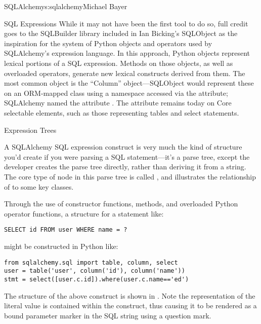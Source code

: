 \begin{aosachapter}{SQLAlchemy}{s:sqlalchemy}{Michael Bayer}
\begin{aosasect1}{SQL Expressions}
While it may not have been the first tool to do so, full
credit goes to the SQLBuilder library included in Ian
Bicking's SQLObject as the inspiration for the
system of Python objects and operators used by
SQLAlchemy's expression language. In this approach,
Python objects represent lexical portions of a SQL
expression. Methods on those objects, as well as
overloaded operators, generate new lexical constructs
derived from them. The most common object is the ``Column''
object---SQLObject would represent these on an ORM-mapped
class using a namespace accessed via the  attribute;
SQLAlchemy named the attribute . The 
attribute remains today on Core selectable elements,
such as those representing tables and select statements.

\begin{aosasect2}{Expression Trees}

A SQLAlchemy SQL expression construct is very much the kind of structure
you'd create if you were parsing a SQL statement---it's a parse tree,
except the developer creates the parse tree directly, rather than
deriving it from a string.   The core type of node in this parse
tree is called , and  illustrates the relationship
of  to some key classes.


Through the use of constructor functions, methods, and overloaded Python
operator functions, a structure for a statement like:

\begin{verbatim}
SELECT id FROM user WHERE name = ?
\end{verbatim}

might be constructed in Python like:

\begin{verbatim}
from sqlalchemy.sql import table, column, select
user = table('user', column('id'), column('name'))
stmt = select([user.c.id]).where(user.c.name=='ed')
\end{verbatim}

The structure of the above  construct is shown in .
Note the representation of the literal value  is contained
within the  construct, thus causing it to be rendered
as a bound parameter marker in the SQL string using a question mark.


\end{aosasect2}
\end{aosasect1}
\end{aosachapter}
